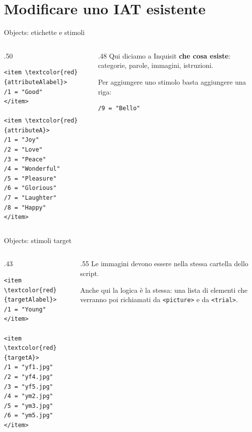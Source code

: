 \documentclass[compress]{beamer}
\begin{document}
\section{Modificare uno IAT esistente}

\begin{frame}[fragile]{Objects: etichette e stimoli}
\begin{columns}[T]
\begin{column}{.50\linewidth}
\begin{small}
\begin{Verbatim}[commandchars=\\\{\}]
<item \textcolor{red}{attributeAlabel}>
/1 = "Good"
</item>

<item \textcolor{red}{attributeA}>
/1 = "Joy"
/2 = "Love"
/3 = "Peace"
/4 = "Wonderful"
/5 = "Pleasure"
/6 = "Glorious"
/7 = "Laughter"
/8 = "Happy"
</item>
\end{Verbatim}
\end{small}
\end{column}
\begin{column}{.48\linewidth}
Qui diciamo a Inquisit \textbf{che cosa esiste}: categorie, parole, immagini, istruzioni.

\vspace{4mm}
Per aggiungere uno stimolo basta aggiungere una riga:
\begin{Verbatim}
/9 = "Bello"
\end{Verbatim}
\end{column}
\end{columns}
\end{frame}

\begin{frame}[fragile]{Objects: stimoli target}
\begin{columns}[T]
\begin{column}{.43\linewidth}
\begin{small}
\begin{Verbatim}[commandchars=\\\{\}]
<item \textcolor{red}{targetAlabel}>
/1 = "Young"
</item>

<item \textcolor{red}{targetA}>
/1 = "yf1.jpg"
/2 = "yf4.jpg"
/3 = "yf5.jpg"
/4 = "ym2.jpg"
/5 = "ym3.jpg"
/6 = "ym5.jpg"
</item>
\end{Verbatim}
\end{small}
\end{column}
\begin{column}{.55\linewidth}
Le immagini devono essere nella stessa cartella dello script.

\vspace{4mm}
Anche qui la logica è la stessa: una lista di elementi che verranno poi richiamati da \texttt{<picture>} e da \texttt{<trial>}.
\end{column}
\end{columns}
\end{frame}
\end{document}
